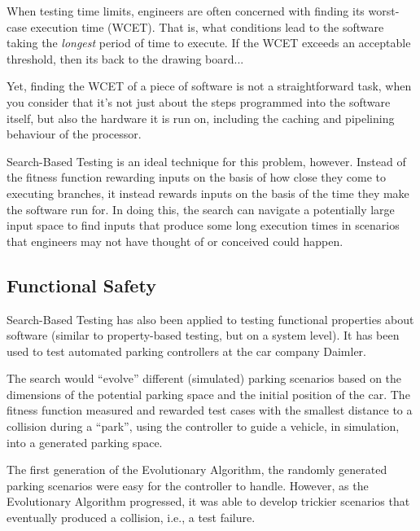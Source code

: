When testing time limits, engineers are often concerned with finding its
worst-case execution time (WCET). That is, what conditions lead to the software
taking the {\it longest} period of time to execute. If the WCET exceeds an
acceptable threshold, then its back to the drawing board...

Yet, finding the WCET of a piece of software is not a straightforward task, when
you consider that it's not just about the steps programmed into the software
itself, but also the hardware it is run on, including the caching and pipelining
behaviour of the processor. 

Search-Based Testing is an ideal technique for this problem, however. Instead of
the fitness function rewarding inputs on the basis of how close they come to
executing branches, it instead rewards inputs on the basis of the time they make
the software run for. In doing this, the search can navigate a potentially large
input space to find inputs that produce some long execution times in scenarios
that engineers may not have thought of or conceived could happen.


\subsection{Functional Safety}

Search-Based Testing has also been applied to testing functional properties
about software (similar to property-based testing, but on a system level). It
has been used to test automated parking controllers at the car company
Daimler. 


The search would ``evolve'' different (simulated) parking scenarios based on the dimensions
of the potential parking space and the initial position of the car. 
The fitness function measured and rewarded test cases
with the smallest distance to a collision during a ``park'', using the
controller to guide a vehicle, in simulation, into a generated parking space.


The first generation of the Evolutionary Algorithm, the randomly generated
parking scenarios were easy for the controller to handle. However, as the
Evolutionary Algorithm progressed, it was able to develop trickier scenarios
that eventually produced a collision, i.e., a test failure.


